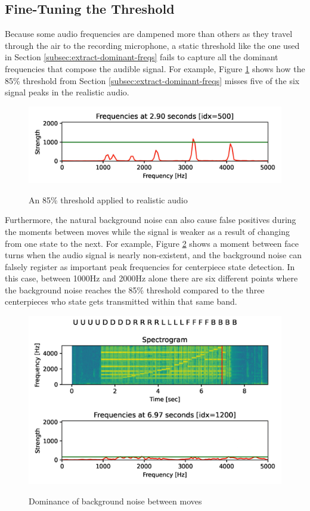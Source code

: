\subsection{Fine-Tuning the Threshold}
\label{subsec:fine-tuning-threshold}
Because some audio frequencies are dampened more than others as they travel through the air to the recording microphone, a static threshold like the one used in Section \ref{subsec:extract-dominant-freqs} fails to capture all the dominant frequencies that compose the audible signal.
For example, Figure \ref{fig:threshold-miss} shows how the 85\% threshold from Section \ref{subsec:extract-dominant-freqs} misses five of the six signal peaks in the realistic audio.

\begin{figure}[h]
    \centering
    \caption{An 85\% threshold applied to realistic audio}
    \includegraphics[width=0.8\linewidth]{Figures/5 Algorithm Design/threshold-miss.png}
    \label{fig:threshold-miss}
\end{figure}

Furthermore, the natural background noise can also cause false positives during the moments between moves while the signal is weaker as a result of changing from one state to the next.
For example, Figure \ref{fig:threshold-false-positives} shows a moment between face turns when the audio signal is nearly non-existent, and the background noise can falsely register as important peak frequencies for centerpiece state detection.
In this case, between 1000Hz and 2000Hz alone there are six different points where the background noise reaches the 85\% threshold compared to the three centerpieces who state gets transmitted within that same band.

\begin{figure}[h]
    \centering
    \caption{Dominance of background noise between moves}
    \includegraphics[width=0.8\linewidth]{Figures/5 Algorithm Design/threshold-false-positives.png}
    \label{fig:threshold-false-positives}
\end{figure}

